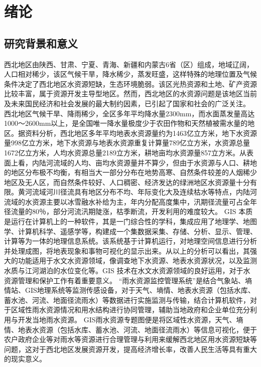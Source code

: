 
\chapter{绪论}

\section{研究背景和意义}

西北地区由陕西、甘肃、宁夏、青海、新疆和内蒙古6省（区）组成，地域辽阔，人口相对稀少，该区气候干旱，降水稀少，蒸发旺盛，这样特殊的地理位置及气候条件决定了西北地区水资源短缺，生态环境脆弱。该区光热资源和土地、矿产资源比较丰富，属于资源开发主导型地区。然而，西北地区的水资源问题是该地区当前及未来国民经济和社会发展的最大制约因素，已引起了国家和社会的广泛关注。
西北地区气候干旱、降雨稀少，全区多年平均降水量2300mm，而水面蒸发量高达1000～2600mm以上，是全国唯一降水量极度少于农田作物和天然植被需水量的地区。据资料分析，西北地区多年平均地表水资源量约为1463亿立方米，地下水资源量998亿立方米，地下水资源与地表水资源重复计算量789亿立方米，水资源总量1672亿立方米，人均水资源总量2189立方米，耕地亩均水资源量857立方米。从表面上看，内陆河流域的人均、亩均水资源量并不算少，但由于水资源与人口、耕地的地区分布极不均衡，有相当大一部分分布在地势高寒、自然条件较差的人烟稀少地区及无人区，而自然条件较好、人口稠密、经济发达的绿洲地区水资源量十分有限。黄河流域河川径流具有地区分布不均、年际变化大及连续枯水等特点，内陆河流域的水资源主要以冰雪融水补给为主，年内分配高度集中，汛期径流量可占全年径流量的80％，部分河流汛期陡涨，枯季断流，开发利用的难度较大。
GIS 本质是运行在计算机上的一种软件，其是一门综合性的学科，集成应用了地理学、地图学、计算机科学、遥感学等，构建成一个集数据采集、存储、分析、显示、管理、计算等为一体的地理信息系统。该系统基于计算机运行，对地理空间信息进行分析并处理成图，将地表现象和事物可视化的显示出来。从以上的分析可以看出，其强大的功能适用于水文水资源领域，像调查地下水资源、地表水资源状况，以及监测水质与江河湖泊的水位变化等。GIS 技术在水文水资源领域的良好运用，对于水资源管理和保护工作有着重要意义。
“雨水资源监控管理系统”是结合气象站、墒情站、GIS地理系统等监测传感设备，对于天气、墒情、地表水资源（包括水库、蓄水池、河流、地面径流雨水）等数据进行实施监测与传输，结合计算机软件，对于区域性雨水资源情况和用水结构进行协同管理，辅助当地政府和企业单位充分利用与开发当地雨水资源。
GIS雨水资源专题图便是将区域性水资源，天气、墒情、地表水资源（包括水库、蓄水池、河流、地面径流雨水）等信息可视化，便于农户政府企业等对雨水等资源进行合理管理与利用来缓解西北地区用水资源短缺等问题，这对于西北地区发展资源开发，提高经济增长率，改善人民生活等具有重大的现实意义。


